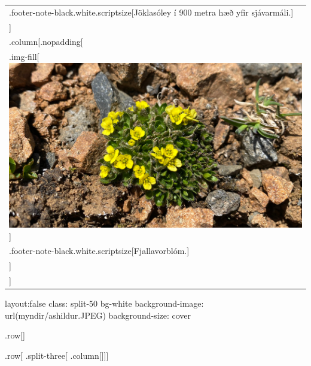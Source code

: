 \documentclass[
]{article}
\begin{document}
\begin{longtable}[]{@{}
  >{\raggedright\arraybackslash}p{}@{}}
.footer-note-black.white.scriptsize{[}Jöklasóley í 900 metra hæð yfir
sjávarmáli.{]} \\
{]} {]} \\
.column{[}.nopadding{[} \\
.img-fill{[}\includegraphics{myndir/breyttar/fjallavorblom.JPEG}{]} \\
.footer-note-black.white.scriptsize{[}Fjallavorblóm.{]} \\
{]} {]} \\
{]} {]} \\
\bottomrule
\end{longtable}

layout:false class: split-50 bg-white background-image:
url(myndir/ashildur.JPEG) background-size: cover

.row{[}{]}

.row{[} .split-three{[} .column{[}{]}{]}{]}
\end{document}
